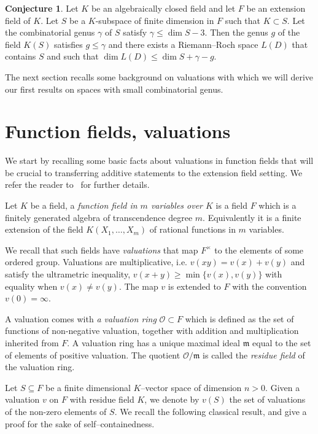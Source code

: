 \documentclass[10pt]{amsart}
\theoremstyle{definition}
\newtheorem{conj}[theo]{Conjecture}
\theoremstyle{remark}
\newcommand*\OO{\mathcal{O}}
\newcommand*\m{\mathfrak m}
\renewcommand{\geq}{\geqslant}
\renewcommand{\leq}{\leqslant}
\begin{document}
\begin{conj}\label{conj}
Let $K$ be an algebraically closed field and let $F$ be an extension field of $K$. Let $S$ be a $K$-subspace of finite dimension in $F$ such that $K\subset S$. Let the combinatorial genus $\gamma$ of $S$ satisfy $\gamma\leq\dim S -3$. Then the genus $g$ of the field $K(S)$ satisfies $g\leq\gamma$ and there exists a Riemann--Roch space $L(D)$ that contains $S$ and such that $\dim L(D)\leq\dim S +\gamma -g$.
\end{conj}

The next section recalls some background on valuations with which we will derive our first results on spaces with small combinatorial genus.

\section{{Function fields, valuations}}\label{sec:valuations}

We start by recalling some basic facts about valuations in function fields that will be crucial to transferring additive statements to the extension field setting. We refer the reader to~\cite[Chapter~6]{Bourbaki_AlgComm5-6} for further details.

Let $K$ be a field, a \emph{function field in $m$ variables over $K$} is a field $F$ which is a finitely generated algebra of transcendence degree $m$. Equivalently it is a finite extension of the field $K(X_1, \ldots, X_m)$ of rational functions in $m$ variables.

We recall that such fields have \emph{valuations} that map $F^{\times}$ to the elements of some ordered group. Valuations are multiplicative, i.e. $v(xy)= v(x) + v(y)$ and satisfy the ultrametric inequality, $v(x+y)\geq\min \{v(x), v(y)\}$ with equality when $v(x) \neq v(y)$. The map $v$ is extended to $F$ with the convention $v(0)=\infty$.

A valuation comes with \emph{a valuation ring} $\OO \subset F$ which is defined as the set of functions of non-negative valuation, together with addition and multiplication inherited from $F$. A valuation ring has a unique maximal ideal $\m$ equal to the set of elements of positive valuation. The quotient $\OO/\m$ is called the \emph{residue field} of the valuation ring.

Let $S \subseteq F$ be a finite dimensional $K$--vector space of dimension $n>0$. Given a valuation $v$ on $F$ with residue field $K$, we denote by $v(S)$ the set of valuations of the non-zero elements of $S$. We recall the following classical result, and give a proof for the sake of self--containedness.
\end{document}
